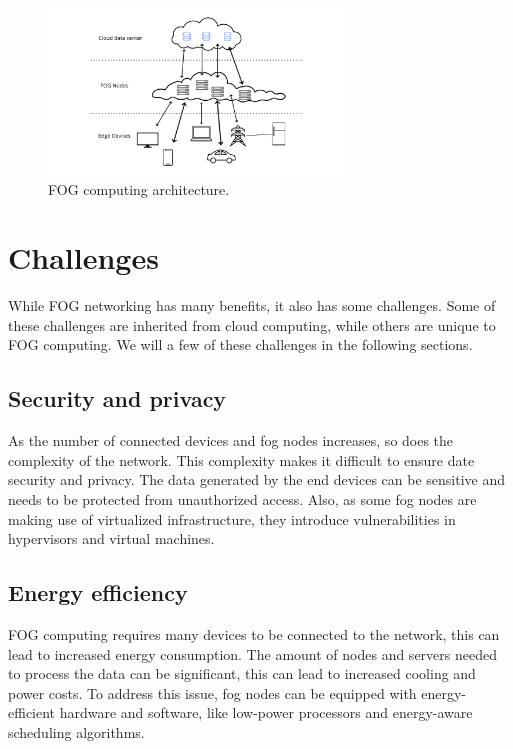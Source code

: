 \begin{figure}[H]
	\centering
	\includegraphics[width=0.70\textwidth]{../images/FOG_network_ink.png}
	\caption{FOG computing architecture.}
	\label{fig:fog-architecture}
\end{figure}

\section{Challenges}
\label{sec:fog-challenges}

While FOG networking has many benefits, it also has some challenges. Some of these challenges are inherited from cloud
computing, while others are unique to FOG computing. We will a few of these challenges in the following sections.

\subsection{Security and privacy}
\label{subsec:fog-security}

As the number of connected devices and fog nodes increases, so does the complexity of the network. This complexity makes
it difficult to ensure date security and privacy. The data generated by the end devices can be sensitive and needs to be
protected from unauthorized access. Also, as some fog nodes are making use of virtualized infrastructure, they
introduce vulnerabilities in hypervisors and virtual machines.

\subsection{Energy efficiency}
\label{subsec:fog-energy}

FOG computing requires many devices to be connected to the network, this can lead to increased energy consumption. The
amount of nodes and servers needed to process the data can be significant, this can lead to increased cooling and power
costs. To address this issue, fog nodes can be equipped with energy-efficient hardware and software, like low-power
processors and energy-aware scheduling algorithms.

